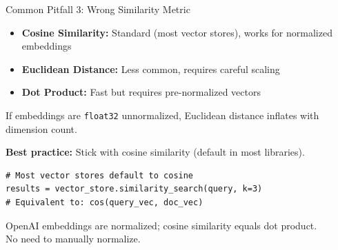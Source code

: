 \documentclass[aspectratio=169,11pt]{beamer}
\begin{document}
\begin{frame}[fragile]{Common Pitfall 3: Wrong Similarity Metric}
  \begin{itemize}
    \setlength{\itemsep}{1pt}
    \item \textbf{Cosine Similarity:} Standard (most vector stores), works for normalized embeddings
    \item \textbf{Euclidean Distance:} Less common, requires careful scaling
    \item \textbf{Dot Product:} Fast but requires pre-normalized vectors
  \end{itemize}

  \vspace{0.05cm}
  \begin{warningbox}[Issue]
    If embeddings are \texttt{float32} unnormalized, Euclidean distance inflates with dimension count.
  \end{warningbox}

  \vspace{0.05cm}
  \textbf{Best practice:} Stick with cosine similarity (default in most libraries).
  \begin{lstlisting}[basicstyle=\ttfamily\tiny]
# Most vector stores default to cosine
results = vector_store.similarity_search(query, k=3)
# Equivalent to: cos(query_vec, doc_vec)
  \end{lstlisting}

  \begin{tipbox}[Note]
    OpenAI embeddings are normalized; cosine similarity equals dot product.\\
    No need to manually normalize.
  \end{tipbox}
\end{frame}
\end{document}
